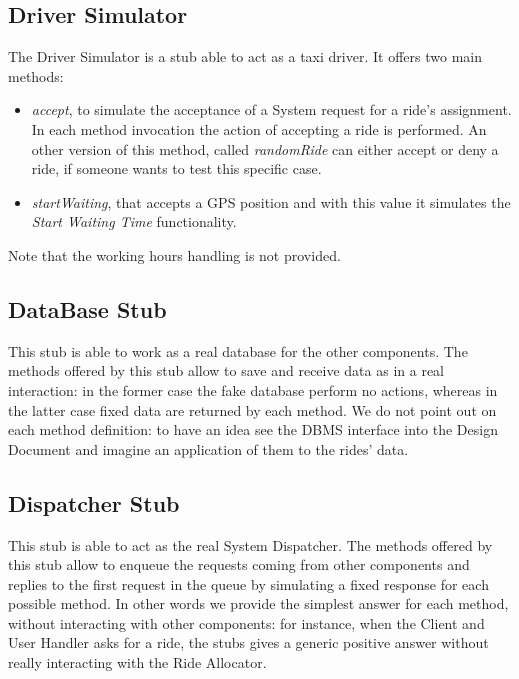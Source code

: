 \documentclass[\mainpath/main]{subfiles}
\begin{document}
\subsection{Driver Simulator}
\label{ProgramStubsAndTestDataRequired:ProgramStubs:DriverSimulator}

The Driver Simulator is a stub able to act as a taxi driver. It offers two main methods:
\begin{itemize}
	\item \textit{accept}, to simulate the acceptance of a System request for a ride's assignment. In each method invocation the action of accepting a ride is performed. An other version of this method, called \textit{randomRide} can either accept or deny a ride, if someone wants to test this specific case.
	\item \textit{startWaiting}, that accepts a GPS position and with this value it simulates the \textit{Start Waiting Time} functionality.
\end{itemize}
Note that the working hours handling is not provided.

\subsection{DataBase Stub}
\label{ProgramStubsAndTestDataRequired:ProgramStubs:DataBaseStub}

This stub is able to work as a real database for the other components. The methods offered by this stub allow to save and receive data as in a real interaction: in the former case the fake database perform no actions, whereas in the latter case fixed data are returned by each method. We do not point out on each method definition: to have an idea see the DBMS interface into the Design Document and imagine an application of them to the rides' data. 

\subsection{Dispatcher Stub}
\label{ProgramStubsAndTestDataRequired:ProgramStubs:DispatcherStub}

This stub is able to act as the real System Dispatcher. The methods offered by this stub allow to enqueue the requests coming from other components and replies to the first request in the queue by simulating a fixed response for each possible method. In other words we provide the simplest answer for each method, without interacting with other components: for instance, when the Client and User Handler asks for a ride, the stubs gives a generic positive answer without really interacting with the Ride Allocator.
\end{document}
